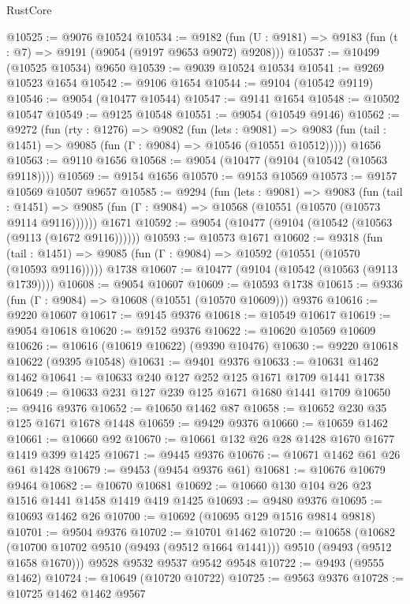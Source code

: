 \begin{lexlean}{RustCore}
\begin{coremodule}
@10525 := @9076 @10524
@10534 := @9182 (fun (U : @9181) => @9183 (fun (t : @7) => @9191 (@9054 (@9197 @9653 @9072) @9208)))
@10537 := @10499 (@10525 @10534) @9650
@10539 := @9039 @10524 @10534
@10541 := @9269 @10523 @1654
@10542 := @9106 @1654
@10544 := @9104 (@10542 @9119)
@10546 := @9054 (@10477 @10544)
@10547 := @9141 @1654
@10548 := @10502 @10547
@10549 := @9125 @10548
@10551 := @9054 (@10549 @9146)
@10562 := @9272
    (fun (rty : @1276) =>
    @9082
      (fun (lets : @9081) =>
      @9083 (fun (tail : @1451) => @9085 (fun (Γ : @9084) => @10546 (@10551 @10512)))))
    @1656
@10563 := @9110 @1656
@10568 := @9054 (@10477 (@9104 (@10542 (@10563 @9118))))
@10569 := @9154 @1656
@10570 := @9153 @10569
@10573 := @9157 @10569 @10507 @9657
@10585 := @9294
    (fun (lets : @9081) =>
    @9083
      (fun (tail : @1451) =>
      @9085 (fun (Γ : @9084) => @10568 (@10551 (@10570 (@10573 @9114 @9116))))))
    @1671
@10592 := @9054 (@10477 (@9104 (@10542 (@10563 (@9113 (@1672 @9116))))))
@10593 := @10573 @1671
@10602 := @9318
    (fun (tail : @1451) => @9085 (fun (Γ : @9084) => @10592 (@10551 (@10570 (@10593 @9116)))))
    @1738
@10607 := @10477 (@9104 (@10542 (@10563 (@9113 @1739))))
@10608 := @9054 @10607
@10609 := @10593 @1738
@10615 := @9336 (fun (Γ : @9084) => @10608 (@10551 (@10570 @10609))) @9376
@10616 := @9220 @10607
@10617 := @9145 @9376
@10618 := @10549 @10617
@10619 := @9054 @10618
@10620 := @9152 @9376
@10622 := @10620 @10569 @10609
@10626 := @10616 (@10619 @10622) (@9390 @10476)
@10630 := @9220 @10618 @10622 (@9395 @10548)
@10631 := @9401 @9376
@10633 := @10631 @1462 @1462
@10641 := @10633 @240 @127 @252 @125 @1671 @1709 @1441 @1738
@10649 := @10633 @231 @127 @239 @125 @1671 @1680 @1441 @1709
@10650 := @9416 @9376
@10652 := @10650 @1462 @87
@10658 := @10652 @230 @35 @125 @1671 @1678 @1448
@10659 := @9429 @9376
@10660 := @10659 @1462
@10661 := @10660 @92
@10670 := @10661 @132 @26 @28 @1428 @1670 @1677 @1419 @399 @1425
@10671 := @9445 @9376
@10676 := @10671 @1462 @61 @26 @61 @1428
@10679 := @9453 (@9454 @9376 @61)
@10681 := @10676 @10679 @9464
@10682 := @10670 @10681
@10692 := @10660 @130 @104 @26 @23 @1516 @1441 @1458 @1419 @419 @1425
@10693 := @9480 @9376
@10695 := @10693 @1462 @26
@10700 := @10692 (@10695 @129 @1516 @9814 @9818)
@10701 := @9504 @9376
@10702 := @10701 @1462
@10720 := @10658
    (@10682 (@10700 @10702 @9510 (@9493 (@9512 @1664 @1441))) @9510 (@9493 (@9512 @1658 @1670)))
    @9528
    @9532
    @9537
    @9542
    @9548
@10722 := @9493 (@9555 @1462)
@10724 := @10649 (@10720 @10722)
@10725 := @9563 @9376
@10728 := @10725 @1462 @1462 @9567

\end{coremodule}
\end{lexlean}

